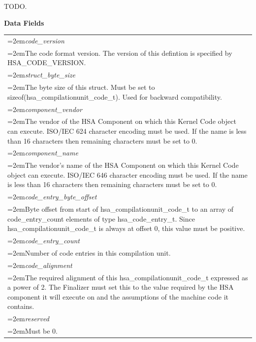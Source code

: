 \documentclass{book}
\newcommand{\hsaarg}[1]{\textit{#1}}
\begin{document}
\begin{appendices}
\begin{tcolorbox}[nobeforeafter,arc=0mm,colframe=white,colback=lightgray,left=0mm]
\end{tcolorbox}
TODO.

\noindent\textbf{Data Fields}\\[-5mm]
\begin{longtable}{@{}>{\hangindent=2em}p{\textwidth}}
\hsaarg{code\_version}\\\hspace{2em}The code format version. The version of this defintion is specified by HSA\_CODE\_VERSION.\\[2mm]
\hsaarg{struct\_byte\_size}\\\hspace{2em}The byte size of this struct. Must be set to sizeof(hsa\_compilationunit\_code\_t). Used for backward compatibility.\\[2mm]
\hsaarg{component\_vendor}\\\hspace{2em}The vendor of the HSA Component on which this Kernel Code object can execute. ISO/IEC 624 character encoding must be used. If the name is less than 16 characters then remaining characters must be set to 0.\\[2mm]
\hsaarg{component\_name}\\\hspace{2em}The vendor's name of the HSA Component on which this Kernel Code object can execute. ISO/IEC 646 character encoding must be used. If the name is less than 16 characters then remaining characters must be set to 0.\\[2mm]
\hsaarg{code\_entry\_byte\_offset}\\\hspace{2em}Byte offset from start of hsa\_compilationunit\_code\_t to an array of code\_entry\_count elements of type hsa\_code\_entry\_t. Since hsa\_compilationunit\_code\_t is always at offset 0, this value must be positive.\\[2mm]
\hsaarg{code\_entry\_count}\\\hspace{2em}Number of code entries in this compilation unit.\\[2mm]
\hsaarg{code\_alignment}\\\hspace{2em}The required alignment of this hsa\_compilationunit\_code\_t expressed as a power of 2. The Finalizer must set this to the value required by the HSA component it will execute on and the assumptions of the machine code it contains.\\[2mm]
\hsaarg{reserved}\\\hspace{2em}Must be 0.\\[2mm]

\end{longtable}
\end{appendices}
\end{document}

